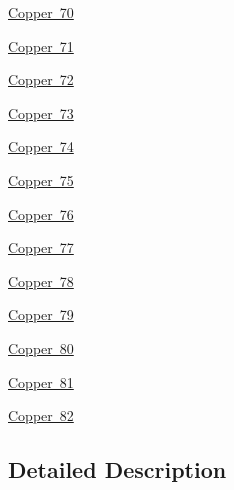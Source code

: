 \begin{DoxyCompactItemize}
\mbox{\hyperlink{group___isotope_const-_copper-_cu70}{Copper 70}}
\item 
\mbox{\hyperlink{group___isotope_const-_copper-_cu71}{Copper 71}}
\item 
\mbox{\hyperlink{group___isotope_const-_copper-_cu72}{Copper 72}}
\item 
\mbox{\hyperlink{group___isotope_const-_copper-_cu73}{Copper 73}}
\item 
\mbox{\hyperlink{group___isotope_const-_copper-_cu74}{Copper 74}}
\item 
\mbox{\hyperlink{group___isotope_const-_copper-_cu75}{Copper 75}}
\item 
\mbox{\hyperlink{group___isotope_const-_copper-_cu76}{Copper 76}}
\item 
\mbox{\hyperlink{group___isotope_const-_copper-_cu77}{Copper 77}}
\item 
\mbox{\hyperlink{group___isotope_const-_copper-_cu78}{Copper 78}}
\item 
\mbox{\hyperlink{group___isotope_const-_copper-_cu79}{Copper 79}}
\item 
\mbox{\hyperlink{group___isotope_const-_copper-_cu80}{Copper 80}}
\item 
\mbox{\hyperlink{group___isotope_const-_copper-_cu81}{Copper 81}}
\item 
\mbox{\hyperlink{group___isotope_const-_copper-_cu82}{Copper 82}}
\end{DoxyCompactItemize}


\subsection{Detailed Description}
